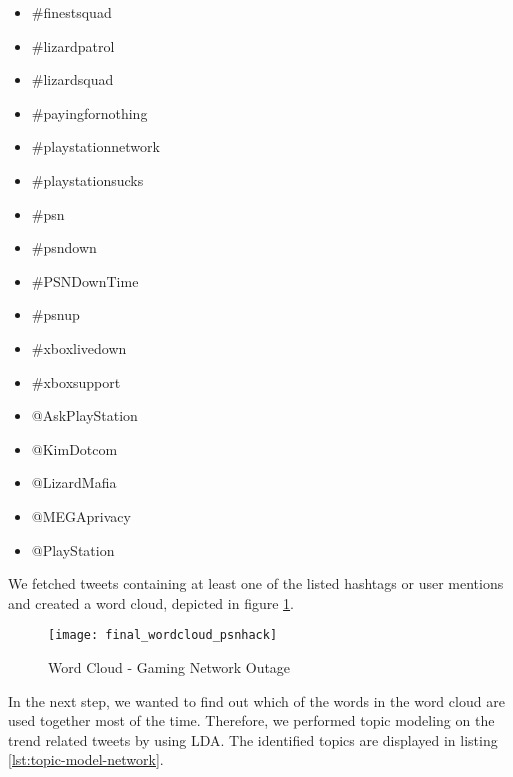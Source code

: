 \begin{multicols}{3}
\begin{itemize}[label={}]
	\item \#finestsquad
	\item \#lizardpatrol
    \item \#lizardsquad
    \item \#payingfornothing
    \item \#playstationnetwork
    \item \#playstationsucks
    \item \#psn
    \item \#psndown
    \item \#PSNDownTime
    \item \#psnup
    \item \#xboxlivedown
    \item \#xboxsupport
    \item @AskPlayStation
    \item @KimDotcom
    \item @LizardMafia
    \item @MEGAprivacy
    \item @PlayStation
\end{itemize}
  \fixspacing
\end{multicols}

We fetched tweets containing at least one of the listed hashtags or user mentions and created a word cloud, depicted in figure \ref{fig:christmas-network-outage-word-cloud}.

\begin{figure}[H]
  \centering
        \texttt{[image: final\_wordcloud\_psnhack]}
  \caption[Word Cloud - Gaming Network Outage]{Word Cloud - Gaming Network Outage}
  \label{fig:christmas-network-outage-word-cloud}
  \vspace{-1.3em}
\end{figure}

In the next step, we wanted to find out which of the words in the word cloud are used together most of the time. Therefore, we performed topic modeling on the trend related tweets by using LDA.
The identified topics are displayed in listing \ref{lst:topic-model-network}.


